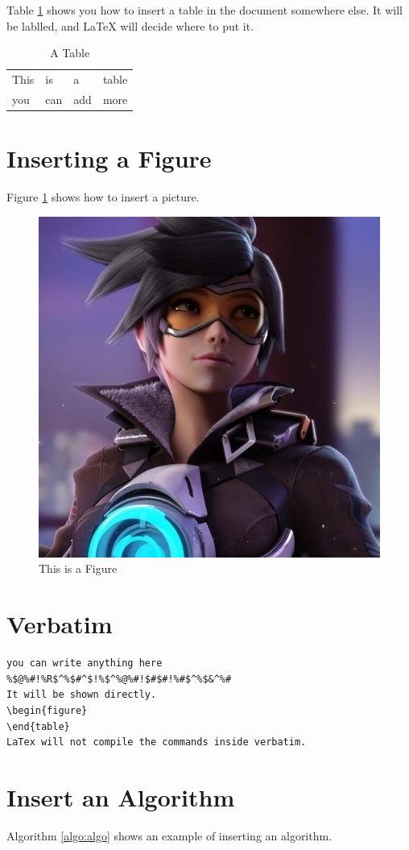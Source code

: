 \documentclass{article}[12pt]
\begin{document}
Table \ref{tab:table} shows you how to insert a table in the document somewhere else. It will be lablled, and LaTeX will decide where to put it.


\begin{table}
  \centering
  \begin{tabular}{|l|l|l|l|}
    \hline
    This & is &a&table\\
    you  & can & add & more \\
    \hline
  \end{tabular}
  \caption{A Table}\label{tab:table}
\end{table}

\section{Inserting a Figure}

Figure \ref{fig:figure} shows how to insert a picture.

\begin{figure}
  \centering
  \includegraphics[width=0.3\columnwidth]{temp.jpg}
  \caption{This is a Figure}\label{fig:figure}
\end{figure}

\section{Verbatim}

\begin{verbatim}
you can write anything here
%$@%#!%R$^%$#^$!%$^%@%#!$#$#!%#$^%$&^%#
It will be shown directly.
\begin{figure}
\end{table}
LaTex will not compile the commands inside verbatim.
\end{verbatim}

\section{Insert an Algorithm}

Algorithm \ref{algo:algo} shows an example of inserting an algorithm.
\end{document}
